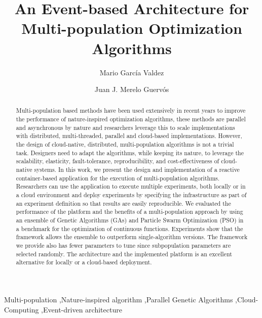 \documentclass[review]{elsarticle}
\begin{document}
\begin{frontmatter}

\title{An Event-based Architecture for Multi-population Optimization Algorithms}

\author[itt]{Mario Garc\'ia Valdez}

\author[granada]{Juan J. Merelo Guerv\'os}

\address[itt]{Department of Graduate Studies, Instituto Tecnol\'ogico de Tijuana, Tijuana BC, Mexico}
\address[granada]{Universidad de Granada, Granada, Spain}

\begin{abstract} 
Multi-population based methods have been used extensively in
recent years to improve the performance of nature-inspired optimization
algorithms, these methods are parallel and asynchronous by nature and researchers
leverage this to scale implementations %
with distributed, multi-threaded,
parallel and cloud-based implementations. However, the design  of cloud-native,  
distributed, multi-population algorithms is not a trivial task. Designers need to adapt the algorithms, while keeping its nature, to
leverage the scalability, elasticity, fault-tolerance,
reproducibility, and cost-effectiveness of cloud-native systems. 
In this
work, we present the design and implementation of a reactive container-based
application for the execution of multi-population algorithms. Researchers can
use the application to execute multiple experiments, both locally or in a cloud
environment and deploy experiments by specifying the infrastructure as part of
an experiment definition so that results are easily reproducible. We
evaluated the performance of the platform and the benefits of a multi-population
approach by using an ensemble of Genetic Algorithms (GAs) and Particle Swarm
Optimization (PSO) in a benchmark for the optimization of continuous functions.
Experiments show that the framework allows the ensemble to outperform
single-algorithm versions. The framework we provide also has fewer parameters to
tune since subpopulation parameters are selected randomly. The architecture and
the implemented platform is an excellent alternative for locally or a
cloud-based deployment.
\end{abstract}

\begin{keyword}
Multi-population \sep Nature-inspired algorithm \sep Parallel Genetic Algorithms \sep Cloud-Computing
\sep Event-driven architecture 
\end{keyword}

\end{frontmatter}
\end{document}
